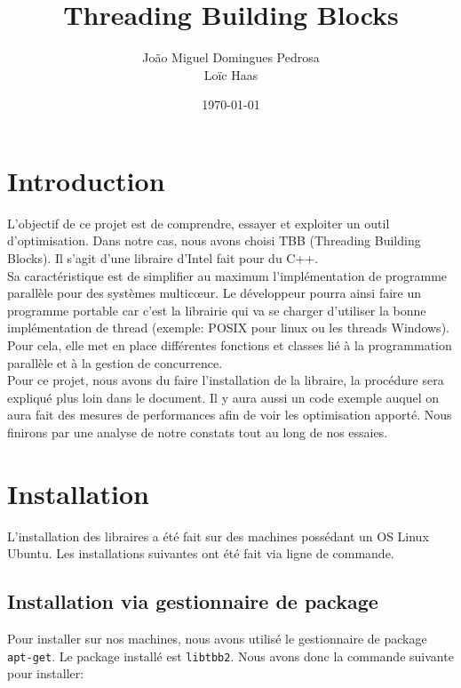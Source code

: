 \documentclass[10pt,a4paper]{article}
\author{João Miguel Domingues Pedrosa \\ Loïc Haas}
\title{Threading Building Blocks}
\date{\today}
\begin{document}
\maketitle
\newpage
\tableofcontents
\newpage


\section{Introduction}
L'objectif de ce projet est de comprendre, essayer et exploiter un outil d'optimisation. Dans notre cas, nous avons choisi TBB (Threading Building Blocks). Il s'agit d'une libraire d'Intel fait pour du C++. \\

Sa caractéristique est de simplifier au maximum l'implémentation de programme parallèle pour des systèmes multicœur. Le développeur pourra ainsi faire un programme portable car c'est la librairie qui va se charger d'utiliser la bonne implémentation de thread (exemple: POSIX pour linux ou les threads Windows). Pour cela, elle met en place différentes fonctions et classes lié à la programmation parallèle et à la gestion de concurrence.\\

Pour ce projet, nous avons du faire l'installation de la libraire, la procédure sera expliqué plus loin dans le document. Il y aura aussi un code exemple auquel on aura fait des mesures de performances afin de voir les optimisation apporté. Nous finirons par une analyse de notre constats tout au long de nos essaies.
\newpage

\section{Installation}
L'installation des libraires a été fait sur des machines possédant un OS Linux Ubuntu. Les installations suivantes ont été fait via ligne de commande.

\subsection{Installation via gestionnaire de package}

Pour installer sur nos machines, nous avons utilisé le gestionnaire de package \texttt{apt-get}. Le package installé est \texttt{libtbb2}. Nous avons donc la commande suivante pour installer:\\
\end{document}
